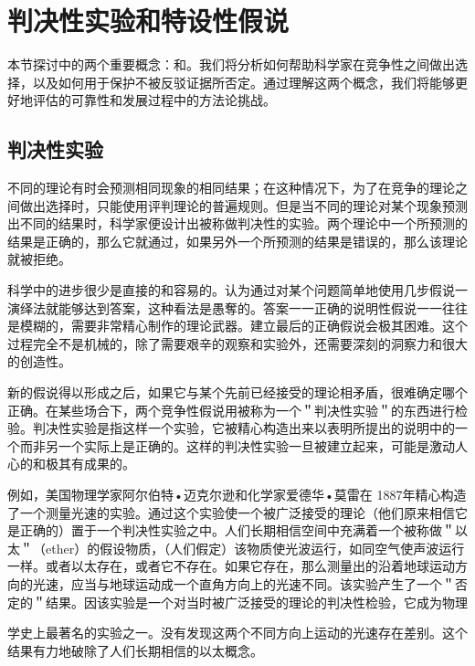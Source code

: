 \section{判决性实验和特设性假说}

\begin{logicbox}[title=引言]
本节探讨中的两个重要概念：和。我们将分析如何帮助科学家在竞争性之间做出选择，以及如何用于保护不被反驳证据所否定。通过理解这两个概念，我们将能够更好地评估的可靠性和发展过程中的方法论挑战。
\end{logicbox}

\subsection{判决性实验}
不同的理论有时会预测相同现象的相同结果；在这种情况下，为了在竞争的理论之间做出选择时，只能使用评判理论的普遍规则。但是当不同的理论对某个现象预测出不同的结果时，科学家便设计出被称做判决性的实验。两个理论中一个所预测的结果是正确的，那么它就通过，如果另外一个所预测的结果是错误的，那么该理论就被拒绝。

科学中的进步很少是直接的和容易的。认为通过对某个问题简单地使用几步假说一演绎法就能够达到答案，这种看法是愚奪的。答案一一正确的说明性假说一一往往是模糊的，需要非常精心制作的理论武器。建立最后的正确假说会极其困难。这个过程完全不是机械的，除了需要艰辛的观察和实验外，还需要深刻的洞察力和很大的创造性。

新的假说得以形成之后，如果它与某个先前已经接受的理论相矛盾，很难确定哪个正确。在某些场合下，两个竞争性假说用被称为一个＂判决性实验＂的东西进行检验。判决性实验是指这样一个实验，它被精心构造出来以表明所提出的说明中的一个而非另一个实际上是正确的。这样的判决性实验一旦被建立起来，可能是激动人心的和极其有成果的。

例如，美国物理学家阿尔伯特•迈克尔逊和化学家爱德华•莫雷在 1887年精心构造了一个测量光速的实验。通过这个实验使一个被广泛接受的理论（他们原来相信它是正确的）置于一个判决性实验之中。人们长期相信空间中充满着一个被称做＂以太＂（ether）的假设物质，（人们假定）该物质使光波运行，如同空气使声波运行一样。或者以太存在，或者它不存在。如果它存在，那么测量出的沿着地球运动方向的光速，应当与地球运动成一个直角方向上的光速不同。该实验产生了一个＂否定的＂结果。因该实验是一个对当时被广泛接受的理论的判决性检验，它成为物理

学史上最著名的实验之一。没有发现这两个不同方向上运动的光速存在差别。这个结果有力地破除了人们长期相信的以太概念。\cite{miller1981}

